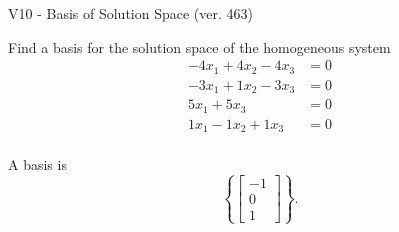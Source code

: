 \begin{exercise}
  \begin{exerciseTitle}V10 - Basis of Solution Space (ver. 463)\end{exerciseTitle}
  \begin{exerciseStatement}
    Find a basis for the solution space of the homogeneous system 
\begin{align*}
 -4 x_ 1 + 4 x_ 2 -4 x_ 3 &= 0  \\ 
  -3 x_ 1 + 1 x_ 2 -3 x_ 3 &= 0  \\ 
  5 x_ 1 + 5 x_ 3 &= 0  \\ 
  1 x_ 1 -1 x_ 2 + 1 x_ 3 &= 0  \\ 
 \end{align*}


 
  \end{exerciseStatement}

  \begin{exerciseAnswer}
   A basis is   
\[\left\{\left[\begin{array}{c}
-1 \\
0 \\
1
\end{array}\right]\right\}.\]

  


  \end{exerciseAnswer}
\end{exercise}